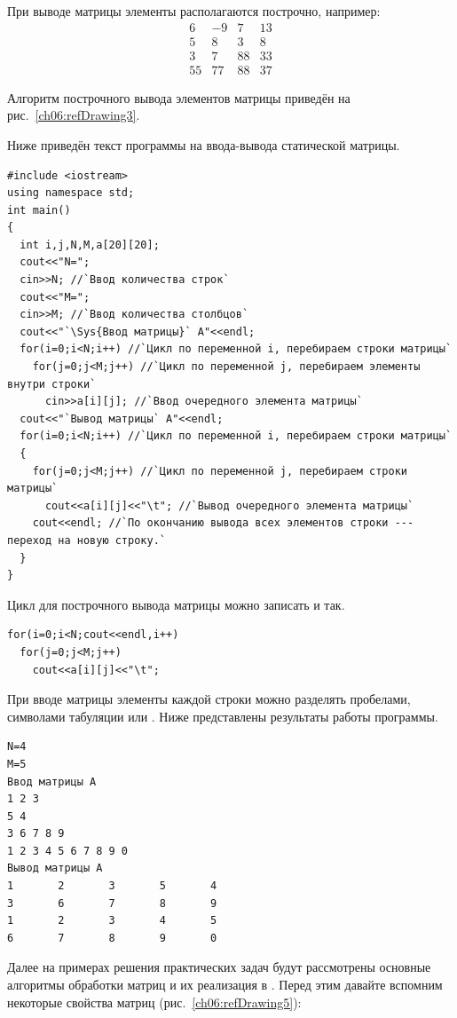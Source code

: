 При выводе матрицы элементы располагаются построчно, например:
$$\begin{matrix}6&-9&7&13\\5&8&3&8\\3&7&88&33\\55&77&88&37\end{matrix}$$

Алгоритм построчного вывода элементов матрицы приведён на рис.~\ref{ch06:refDrawing3}.


Ниже приведён текст программы на  ввода-вывода статической матрицы.
\begin{lstlisting}
#include <iostream>
using namespace std;
int main()
{
  int i,j,N,M,a[20][20];
  cout<<"N=";
  cin>>N; //`Ввод количества строк`
  cout<<"M=";
  cin>>M; //`Ввод количества столбцов`
  cout<<"`\Sys{Ввод матрицы}` A"<<endl;
  for(i=0;i<N;i++) //`Цикл по переменной i, перебираем строки матрицы`
    for(j=0;j<M;j++) //`Цикл по переменной j, перебираем элементы внутри строки`
      cin>>a[i][j]; //`Ввод очередного элемента матрицы`
  cout<<"`Вывод матрицы` A"<<endl;
  for(i=0;i<N;i++) //`Цикл по переменной i, перебираем строки матрицы`
  {
    for(j=0;j<M;j++) //`Цикл по переменной j, перебираем строки матрицы`
      cout<<a[i][j]<<"\t"; //`Вывод очередного элемента матрицы`
    cout<<endl; //`По окончанию вывода всех элементов строки --- переход на новую строку.`
  }
}
\end{lstlisting}

Цикл для построчного вывода матрицы можно записать и так.
\begin{lstlisting}
for(i=0;i<N;cout<<endl,i++)
  for(j=0;j<M;j++)
    cout<<a[i][j]<<"\t";
\end{lstlisting}
При вводе матрицы элементы каждой строки можно разделять пробелами, символами табуляции или
.
Ниже 
представлены результаты работы программы.
\begin{verbatim}
N=4
M=5
Ввод матрицы A
1 2 3
5 4
3 6 7 8 9
1 2 3 4 5 6 7 8 9 0
Вывод матрицы A
1       2       3       5       4	
3       6       7       8       9	
1       2       3       4       5	
6       7       8       9       0
\end{verbatim}

Далее на примерах решения практических задач будут рассмотрены основные алгоритмы обработки матриц и их реализация в
. Перед этим давайте вспомним некоторые свойства матриц (рис.~\ref{ch06:refDrawing5}):


